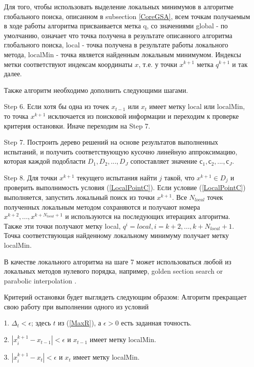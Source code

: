 \documentclass[entropy,article,submit,moreauthors,pdftex]{Definitions/mdpi}
\begin{document}
Для того, чтобы использовать выделение локальных минимумов в алгоритме глобального поиска, описанном в subsection \ref{CoreGSA}, всем точкам получаемым в ходе работы алгоритма присваивается метка q, со значениями global - по умолчанию, означает что точка получена в результате описанного алгоритма глобального поиска, local - точка получена в результате работы локального метода, localMin - точка является найденным локальным минимумом. Индексы метки соответствуют индексам координаты $x$, т.е. у точки  $x^{k+1}$ метка $q^{k+1}$ и так далее.

Также алгоритм необходимо дополнить следующими шагами. 

Step 6. Если хотя бы одна из точек $x_{t-1}$ или $x_t$ имеет метку local или localMin, то точка $x^{k+1}$ исключается из поисковой информации и переходим к проверке критерия остановки. Иначе переходим на Step 7.

Step 7. Построить дерево решений на основе результатов выполненных испытаний, и получить соответствующую кусочно линейную аппроксимацию, которая каждой подобласти $D_1, D_2, ..., D_J$ сопоставляет значение $с_1, с_2, ..., с_J$.

Step 8. Для точки $x^{k+1}$ текущего испытания найти $j$ такой, что $x^{k+1} \in D_j$ и проверить выполнимость условия (\ref{LocalPointC}). Если условие (\ref{LocalPointC}) выполняется, запустить локальный поиск из точки $x^{k+1}$. Все $N_{local}$ точек полученных локальным методом сохраняются и получают номера $x^{k+2}, ..., x^{k+N_{local}+1}$  и используются на последующих итерациях алгоритма. Также эти точки получают метку local, $q^{i}=local, i = k+2, ... , k+N_{local}+1 $. Точка соответствующая найденному локальному минимуму получает метку localMin.


В качестве локального алгоритма на шаге 7 может использоваться любой из локальных методов нулевого порядка, например,  golden section search or parabolic interpolation \cite{Press}.

Критерий остановки будет выглядеть следующим образом:
 Алгоритм прекращает свою работу при выполнении одного из условий
 
1. $\Delta_t<\epsilon$; здесь $t$ из (\ref{MaxR}), а $\epsilon>0$ есть заданная точность. 
 
2. $|x^{k+1}_i-x_{t-1}|<\epsilon$ и $x_{t-1}$ имеет метку localMin.

3. $|x^{k+1}_i-x_{t}|<\epsilon$ и $x_{t}$ имеет метку localMin.


\end{document}
